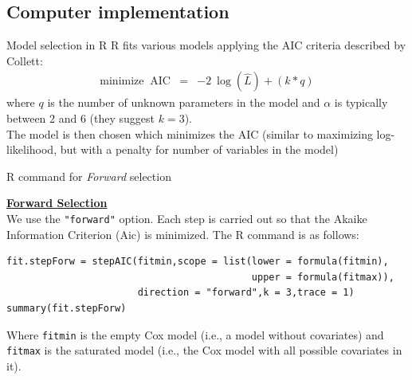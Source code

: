 \documentclass[envcountsect, 10pt, portrait, palatino]{beamer}
\begin{document}
\subsection{Computer implementation}
\begin{frame}{Model selection in R}
R fits various models applying the AIC criteria described by Collett:
\begin{eqnarray*}
\mbox{minimize } ~\mbox{AIC} & = & -2 ~\log(\hat{L}) + (k*q )
\end{eqnarray*}
where $q$ is the number of unknown parameters in the model and $\alpha$ is
typically between 2 and 6 (they suggest $k=3$).
\\[2ex]
The model is then chosen which minimizes the AIC (similar to maximizing log-likelihood, but with a penalty for
number of variables in the model)
\end{frame}
\begin{frame}[fragile]{R command for \textit{Forward} selection}

\underline{\bf Forward Selection}
\\[2ex]
We use the {\tt "forward"} option. Each step is carried out so that the Akaike Information Criterion (Aic) is minimized.  The R command is as follows:

\small
\begin{verbatim}
fit.stepForw = stepAIC(fitmin,scope = list(lower = formula(fitmin),
                                           upper = formula(fitmax)),
                       direction = "forward",k = 3,trace = 1)
summary(fit.stepForw)
\end{verbatim}
\normalsize
Where {\tt fitmin} is the empty Cox model (i.e., a model without covariates) and {\tt fitmax} is the saturated model (i.e., the Cox model with all possible covariates in it).
\end{frame}
\end{document}
